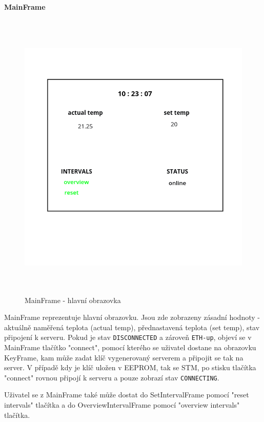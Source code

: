 \paragraph{MainFrame}
\begin{figure}[H]\centering
\includegraphics[width=140mm, height=140mm]{..//img/main_frame_online.jpg}
\caption{MainFrame - hlavní obrazovka}
\label{main-frame}
\end{figure}

MainFrame reprezentuje hlavní obrazovku.
Jsou zde zobrazeny zásadní hodnoty - aktuálně naměřená teplota (actual temp), přednastavená teplota
(set temp), stav připojení k serveru.
Pokud je stav \texttt{DISCONNECTED} a zároveň \texttt{ETH-up}, objeví se v MainFrame tlačítko "connect",
pomocí kterého se uživatel dostane na obrazovku KeyFrame, kam může zadat klíč vygenerovaný serverem a
připojit se tak na server.
V případě kdy je klíč uložen v EEPROM, tak se STM, po stisku tlačítka "connect" rovnou připojí k serveru
a pouze zobrazí stav \texttt{CONNECTING}.

Uživatel se z MainFrame také může dostat do SetIntervalFrame pomocí "reset intervals" tlačítka a do
OverviewIntervalFrame pomocí "overview intervals" tlačítka.

